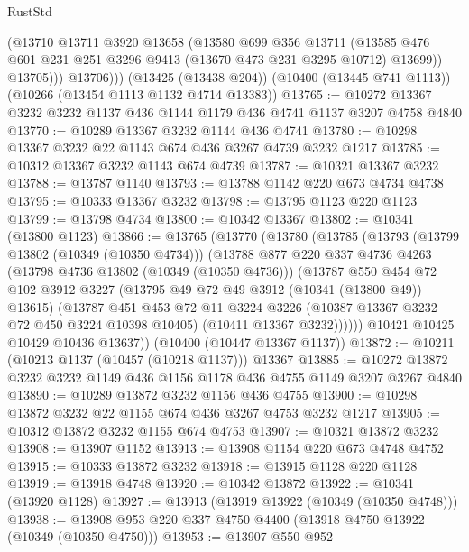\begin{lexlean}{RustStd}
\begin{coremodule}
              (@13710
                @13711
                @3920
                @13658
                (@13580
                  @699
                  @356
                  @13711
                  (@13585 @476 @601 @231 @251 @3296 @9413 (@13670 @473 @231 @3295 @10712) @13699))
                @13705)))
          @13706)))
    (@13425 (@13438 @204))
    (@10400 (@13445 @741 @1113))
    (@10266 (@13454 @1113 @1132 @4714 @13383))
@13765 := @10272 @13367 @3232 @3232 @1137 @436 @1144 @1179 @436 @4741 @1137 @3207 @4758 @4840
@13770 := @10289 @13367 @3232 @1144 @436 @4741
@13780 := @10298 @13367 @3232 @22 @1143 @674 @436 @3267 @4739 @3232 @1217
@13785 := @10312 @13367 @3232 @1143 @674 @4739
@13787 := @10321 @13367 @3232
@13788 := @13787 @1140
@13793 := @13788 @1142 @220 @673 @4734 @4738
@13795 := @10333 @13367 @3232
@13798 := @13795 @1123 @220 @1123
@13799 := @13798 @4734
@13800 := @10342 @13367
@13802 := @10341 (@13800 @1123)
@13866 := @13765
    (@13770
      (@13780
        (@13785
          (@13793
            (@13799 @13802 (@10349 (@10350 @4734)))
            (@13788
              @877
              @220
              @337
              @4736
              @4263
              (@13798 @4736 @13802 (@10349 (@10350 @4736)))
              (@13787
                @550
                @454
                @72
                @102
                @3912
                @3227
                (@13795 @49 @72 @49 @3912 (@10341 (@13800 @49)) @13615)
                (@13787
                  @451
                  @453
                  @72
                  @11
                  @3224
                  @3226
                  (@10387 @13367 @3232 @72 @450 @3224 @10398 @10405)
                  (@10411 @13367 @3232))))))
        @10421
        @10425
        @10429
        @10436
        @13637))
    (@10400 (@10447 @13367 @1137))
@13872 := @10211 (@10213 @1137 (@10457 (@10218 @1137))) @13367
@13885 := @10272 @13872 @3232 @3232 @1149 @436 @1156 @1178 @436 @4755 @1149 @3207 @3267 @4840
@13890 := @10289 @13872 @3232 @1156 @436 @4755
@13900 := @10298 @13872 @3232 @22 @1155 @674 @436 @3267 @4753 @3232 @1217
@13905 := @10312 @13872 @3232 @1155 @674 @4753
@13907 := @10321 @13872 @3232
@13908 := @13907 @1152
@13913 := @13908 @1154 @220 @673 @4748 @4752
@13915 := @10333 @13872 @3232
@13918 := @13915 @1128 @220 @1128
@13919 := @13918 @4748
@13920 := @10342 @13872
@13922 := @10341 (@13920 @1128)
@13927 := @13913 (@13919 @13922 (@10349 (@10350 @4748)))
@13938 := @13908 @953 @220 @337 @4750 @4400 (@13918 @4750 @13922 (@10349 (@10350 @4750)))
@13953 := @13907
    @550
    @952

\end{coremodule}
\end{lexlean}

